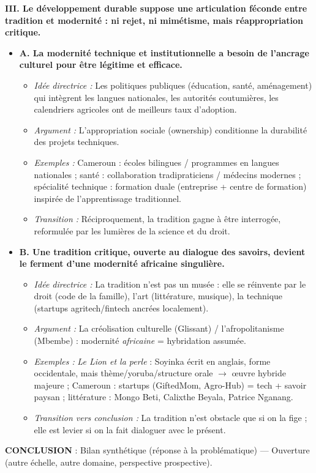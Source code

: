 \documentclass[11pt]{article}
\begin{document}
\begin{exoresolu}
\bigskip
\textbf{III. Le développement durable suppose une articulation féconde entre tradition et modernité : ni rejet, ni mimétisme, mais réappropriation critique.}
\begin{itemize}
\item \textbf{A. La modernité technique et institutionnelle a besoin de l'ancrage culturel pour être légitime et efficace.}
      \begin{itemize}
      \item \textit{Idée directrice :} Les politiques publiques (éducation, santé, aménagement) qui intègrent les langues nationales, les autorités coutumières, les calendriers agricoles ont de meilleurs taux d'adoption.
      \item \textit{Argument :} L'appropriation sociale (ownership) conditionne la durabilité des projets techniques.
      \item \textit{Exemples :} Cameroun : écoles bilingues / programmes en langues nationales ; santé : collaboration tradipraticiens / médecins modernes ; spécialité technique : formation duale (entreprise + centre de formation) inspirée de l'apprentissage traditionnel.
      \item \textit{Transition :} Réciproquement, la tradition gagne à être interrogée, reformulée par les lumières de la science et du droit.
      \end{itemize}
\item \textbf{B. Une tradition critique, ouverte au dialogue des savoirs, devient le ferment d'une modernité africaine singulière.}
      \begin{itemize}
      \item \textit{Idée directrice :} La tradition n'est pas un musée : elle se réinvente par le droit (code de la famille), l'art (littérature, musique), la technique (startups agritech/fintech ancrées localement).
      \item \textit{Argument :} La créolisation culturelle (Glissant) / l'afropolitanisme (Mbembe) : modernité \emph{africaine} = hybridation assumée.
      \item \textit{Exemples :} \emph{Le Lion et la perle} : Soyinka écrit en anglais, forme occidentale, mais thème/yoruba/structure orale $\rightarrow$ œuvre hybride majeure ; Cameroun : startups (GiftedMom, Agro-Hub) = tech + savoir paysan ; littérature : Mongo Beti, Calixthe Beyala, Patrice Nganang.
      \item \textit{Transition vers conclusion :} La tradition n'est obstacle que si on la fige ; elle est levier si on la fait dialoguer avec le présent.
      \end{itemize}
\end{itemize}

\bigskip
\textbf{CONCLUSION} : Bilan synthétique (réponse à la problématique) — Ouverture (autre échelle, autre domaine, perspective prospective).

\end{exoresolu}
\end{document}
